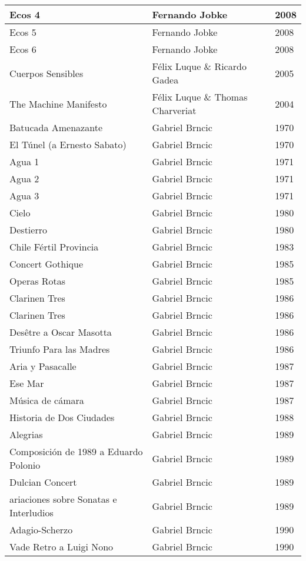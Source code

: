 \begin{center}
\begin{longtable}{| p{} | p{} | p{} |}
Ecos 4 & Fernando Jobke & 2008 \\ \hline 
Ecos 5 & Fernando Jobke & 2008 \\ \hline 
Ecos 6 & Fernando Jobke & 2008 \\ \hline 
Cuerpos Sensibles & Félix Luque \& Ricardo Gadea & 2005 \\ \hline 
The Machine Manifesto & Félix Luque \& Thomas Charveriat & 2004 \\ \hline 
Batucada Amenazante & Gabriel Brncic & 1970 \\ \hline 
El Túnel (a Ernesto Sabato) & Gabriel Brncic & 1970 \\ \hline 
Agua 1 & Gabriel Brncic & 1971 \\ \hline 
Agua 2 & Gabriel Brncic & 1971 \\ \hline 
Agua 3 & Gabriel Brncic & 1971 \\ \hline 
Cielo & Gabriel Brncic & 1980 \\ \hline 
Destierro & Gabriel Brncic & 1980 \\ \hline 
Chile Fértil Provincia & Gabriel Brncic & 1983 \\ \hline 
Concert Gothique & Gabriel Brncic & 1985 \\ \hline 
Operas Rotas & Gabriel Brncic & 1985 \\ \hline 
Clarinen Tres & Gabriel Brncic & 1986 \\ \hline 
Clarinen Tres & Gabriel Brncic & 1986 \\ \hline 
Desêtre a Oscar Masotta & Gabriel Brncic & 1986 \\ \hline 
Triunfo Para las Madres & Gabriel Brncic & 1986 \\ \hline 
Aria y Pasacalle & Gabriel Brncic & 1987 \\ \hline 
Ese Mar & Gabriel Brncic & 1987 \\ \hline 
Música de cámara & Gabriel Brncic & 1987 \\ \hline 
Historia de Dos Ciudades & Gabriel Brncic & 1988 \\ \hline 
Alegrias & Gabriel Brncic & 1989 \\ \hline 
Composición de 1989 a Eduardo Polonio & Gabriel Brncic & 1989 \\ \hline 
Dulcian Concert & Gabriel Brncic & 1989 \\ \hline 
ariaciones sobre Sonatas e Interludios & Gabriel Brncic & 1989 \\ \hline 
Adagio-Scherzo & Gabriel Brncic & 1990 \\ \hline 
Vade Retro a Luigi Nono & Gabriel Brncic & 1990 \\ \hline 

\end{longtable}
\end{center}

